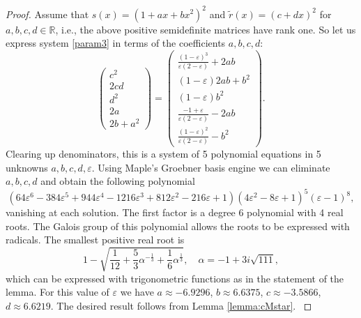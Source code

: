 \documentclass[10pt,a4paper]{amsart}
\newcommand{\R}{\mathbb{R}} %
\begin{document}
\begin{proof}
Assume that $s(x)=(1+ax+bx^2)^2$ and ${\tilde{r}}(x)=(c+dx)^2$ for $a,b,c,d \in \R$, i.e., the above positive semidefinite matrices have rank one. So let us express system \eqref{param3} in terms of the coefficients $a,b,c,d$:
\[
\left(\begin{array}{c}
c^2 \\ 2cd \\ d^2 \\ \hline 2a  \\ 2b+a^2
\end{array}\right)
=
\left(\begin{array}{c}
\frac{(1-\varepsilon)^3}{\varepsilon(2-\varepsilon)} + 2ab \\ (1-\varepsilon)2ab + b^2 \\ (1-\varepsilon)b^2 \\ \hline \frac{-1+\varepsilon}{\varepsilon(2-\varepsilon)} - 2ab \\ \frac{(1-\varepsilon)^2}{\varepsilon(2-\varepsilon)} - b^2
\end{array}\right).
\]
Clearing up denominators, this is a system of 5 polynomial equations in 5 unknowns $a,b,c,d,\varepsilon$. Using Maple's Groebner basis engine we can eliminate $a,b,c,d$ and obtain the following polynomial
\[
(64\varepsilon^6 - 384\varepsilon^5 + 944\varepsilon^4 - 1216\varepsilon^3 + 812\varepsilon^2 - 216\varepsilon + 1)(4\varepsilon^2 - 8\varepsilon + 1)^5(\varepsilon - 1)^8,
\]
vanishing at each solution. The first factor is 
a degree 6 polynomial with 4 real roots. The Galois group of this polynomial allows the roots to be expressed with radicals. The smallest positive real root is
\[
1-\sqrt{ \frac{1}{12} + \frac{5}{3}\alpha^{-\frac{1}{3}} + \frac{1}{6}\alpha^{\frac{1}{3}}},\quad \alpha = -1+3i\sqrt{111} ,
\]
which can be expressed with trigonometric functions as in the statement of the lemma. For this value of $\varepsilon$ we have $a \approx -6.9296$, $b \approx 6.6375$, $c \approx -3.5866$, $d \approx 6.6219$. 
{The desired result follows from Lemma \ref{lemma:cMstar}. }
\end{proof}
\end{document}
